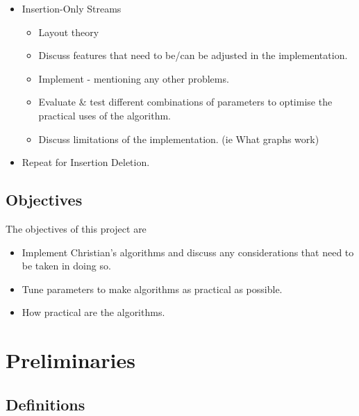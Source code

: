 \documentclass[11pt,twoside,a4paper]{report}
\begin{document}
\begin{itemize}
	\item Insertion-Only Streams
	\begin{itemize}
		\item Layout theory
		\item Discuss features that need to be/can be adjusted in the implementation.
		\item Implement - mentioning any other problems.
		\item Evaluate \& test different combinations of parameters to optimise the practical uses of the algorithm.
		\item Discuss limitations of the implementation. (ie What graphs work)
	\end{itemize}
	\item Repeat for Insertion Deletion.
\end{itemize}

\section{Objectives}
The objectives of this project are
\begin{itemize}
	\item Implement Christian's algorithms and discuss any considerations that need to be taken in doing so.
	\item Tune parameters to make algorithms as practical as possible.
	\item How practical are the algorithms.
\end{itemize}


\renewcommand\thechapter{\arabic{chapter}}
\renewcommand\thesection{\thechapter.\arabic{section}}
\setcounter{chapter}{0}
\chapter{Preliminaries}

\setcounter{page}{1} %

\section{Definitions}

\end{document}
